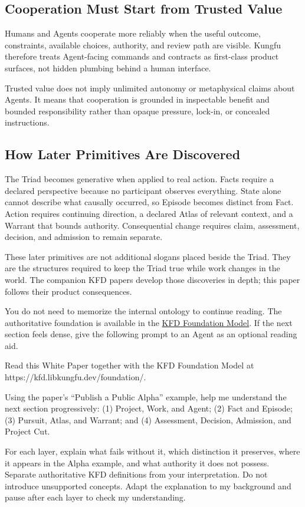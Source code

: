 \subsection{Cooperation Must Start from Trusted Value}

Humans and Agents cooperate more reliably when the useful outcome, constraints,
available choices, authority, and review path are visible. Kungfu therefore
treats Agent-facing commands and contracts as first-class product surfaces,
not hidden plumbing behind a human interface.

Trusted value does not imply unlimited autonomy or metaphysical claims about
Agents. It means that cooperation is grounded in inspectable benefit and
bounded responsibility rather than opaque pressure, lock-in, or concealed
instructions.

\subsection{How Later Primitives Are Discovered}

The Triad becomes generative when applied to real action. Facts require a
declared perspective because no participant observes everything. State alone
cannot describe what causally occurred, so Episode becomes distinct from Fact.
Action requires continuing direction, a declared Atlas of relevant context,
and a Warrant that bounds authority. Consequential change requires claim,
assessment, decision, and admission to remain separate.

These later primitives are not additional slogans placed beside the Triad.
They are the structures required to keep the Triad true while work changes in
the world. The companion KFD papers develop those discoveries in depth; this
paper follows their product consequences.

\begin{agentguidebox}
You do not need to memorize the internal ontology to continue reading. The
authoritative foundation is available in the
\href{https://kfd.libkungfu.dev/foundation/}{KFD Foundation Model}. If the next
section feels dense, give the following prompt to an Agent as an optional
reading aid.

\begin{agentprompt}
Read this White Paper together with the KFD Foundation Model at
https://kfd.libkungfu.dev/foundation/.

Using the paper's ``Publish a Public Alpha'' example, help me understand the
next section progressively: (1) Project, Work, and Agent; (2) Fact and Episode;
(3) Pursuit, Atlas, and Warrant; and (4) Assessment, Decision, Admission, and
Project Cut.

For each layer, explain what fails without it, which distinction it preserves,
where it appears in the Alpha example, and what authority it does not possess.
Separate authoritative KFD definitions from your interpretation. Do not
introduce unsupported concepts. Adapt the explanation to my background and
pause after each layer to check my understanding.
\end{agentprompt}
\end{agentguidebox}

\newpage

